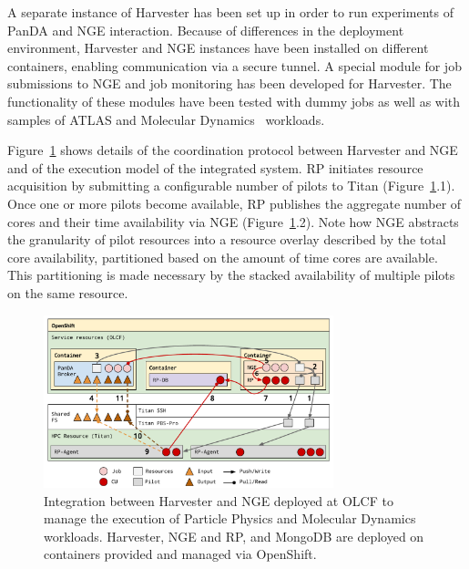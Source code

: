 \documentclass{webofc}
\begin{document}
A separate instance of Harvester has been set up in order to run experiments
of PanDA and NGE interaction. Because of differences in the deployment
environment, Harvester and NGE instances have been installed on different
containers, enabling communication via a secure tunnel. A special module for
job submissions to NGE and job monitoring has been developed for Harvester.
The functionality of these modules have been tested with dummy jobs as well
as with samples of ATLAS and Molecular
Dynamics~\cite{3b6dad414e794d36954333f8f177f47c} workloads.

Figure~\ref{fig:integration} shows details of the coordination protocol
between Harvester and NGE and of the execution model of the integrated
system. RP initiates resource acquisition by submitting a configurable number
of pilots to Titan (Figure~\ref{fig:integration}.1). Once one or more pilots
become available, RP publishes the aggregate number of cores and their time
availability via NGE (Figure~\ref{fig:integration}.2). Note how NGE abstracts
the granularity of pilot resources into a resource overlay described by the
total core availability, partitioned based on the amount of time cores are
available. This partitioning is made necessary by the stacked availability of
multiple pilots on the same resource.

\begin{figure}
  \centering
  \includegraphics[width=0.75\textwidth]{figures/integration.pdf}
  \caption{Integration between Harvester and NGE deployed at OLCF to manage
           the execution of Particle Physics and Molecular Dynamics
           workloads. Harvester, NGE and RP, and MongoDB are deployed on
           containers provided and managed via
           OpenShift.}\label{fig:integration}
\end{figure}
\end{document}
